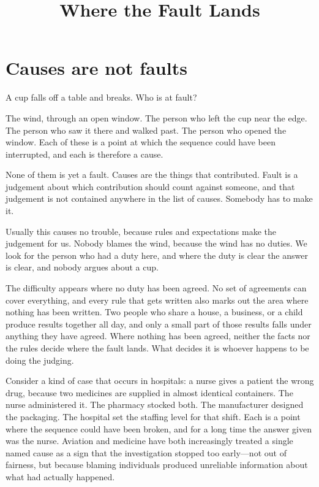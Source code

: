 \documentclass{article}
\title{Where the Fault Lands}
\author{}
\date{}
\begin{document}
\maketitle

\section{Causes are not faults}
A cup falls off a table and breaks. Who is at fault?

The wind, through an open window. The person who left the cup near the edge. The person who saw it there and walked past. The person who opened the window. Each of these is a point at which the sequence could have been interrupted, and each is therefore a cause.

None of them is yet a fault. Causes are the things that contributed. Fault is a judgement about which contribution should count against someone, and that judgement is not contained anywhere in the list of causes. Somebody has to make it.

Usually this causes no trouble, because rules and expectations make the judgement for us. Nobody blames the wind, because the wind has no duties. We look for the person who had a duty here, and where the duty is clear the answer is clear, and nobody argues about a cup.

The difficulty appears where no duty has been agreed. No set of agreements can cover everything, and every rule that gets written also marks out the area where nothing has been written. Two people who share a house, a business, or a child produce results together all day, and only a small part of those results falls under anything they have agreed. Where nothing has been agreed, neither the facts nor the rules decide where the fault lands. What decides it is whoever happens to be doing the judging.

Consider a kind of case that occurs in hospitals: a nurse gives a patient the wrong drug, because two medicines are supplied in almost identical containers. The nurse administered it. The pharmacy stocked both. The manufacturer designed the packaging. The hospital set the staffing level for that shift. Each is a point where the sequence could have been broken, and for a long time the answer given was the nurse. Aviation and medicine have both increasingly treated a single named cause as a sign that the investigation stopped too early---not out of fairness, but because blaming individuals produced unreliable information about what had actually happened.
\end{document}
